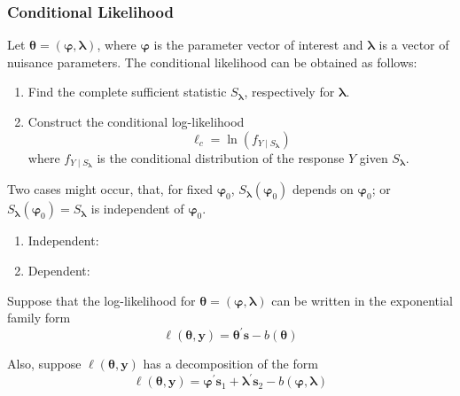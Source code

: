 \subsubsection{Conditional Likelihood}

Let $\boldsymbol{\theta}=(\boldsymbol{\varphi},\boldsymbol{\lambda})$, where $\boldsymbol{\varphi}$ is the parameter vector of interest and $\boldsymbol{\lambda}$ is a vector of nuisance parameters. The conditional likelihood can be obtained as follows:
\begin{enumerate}
    \item Find the complete sufficient statistic $S_{\boldsymbol{\lambda}}$, respectively for $\boldsymbol{\lambda}$.
    \item  Construct the conditional log-likelihood
          \begin{equation}
              \ell_{c}=\ln\left(f_{Y\mid S_{\boldsymbol{\lambda}}}\right)
          \end{equation}
          where $f_{Y\mid S_{\boldsymbol{\lambda}}}$ is the conditional distribution of the response $Y$ given $S_{\boldsymbol{\lambda}}$.
\end{enumerate}

\begin{remark}
    Two cases might occur, that, for fixed $\boldsymbol{\varphi}_{0}$, $S_{\boldsymbol{\lambda}}\left(\boldsymbol{\varphi}_{0}\right)$ depends on $\boldsymbol{\varphi}_{0}$; or $S_{\boldsymbol{\lambda}}\left(\boldsymbol{\varphi}_{0}\right)=S_{\boldsymbol{\lambda}}$ is independent of $\boldsymbol{\varphi}_{0}$.
    \begin{enumerate}
        \item Independent:
        \item Dependent:
    \end{enumerate}
\end{remark}

Suppose that the log-likelihood for $\boldsymbol{\theta}=\left(\boldsymbol{\varphi},\boldsymbol{\lambda}\right)$ can be written in the exponential family form
\begin{equation}
    \ell\left(\boldsymbol{\theta},\mathbf{y}\right)=\boldsymbol{\theta}^{\prime}\mathbf{s}-b\left(\boldsymbol{\theta}\right)
\end{equation}

Also, suppose $\ell\left(\boldsymbol{\theta},\mathbf{y}\right)$ has a decomposition of the form
\begin{equation}
    \ell\left(\boldsymbol{\theta},\mathbf{y}\right)=\boldsymbol{\varphi}^{\prime}\mathbf{s}_{1}+\boldsymbol{\lambda}^{\prime}\mathbf{s}_{2}-b(\boldsymbol{\varphi},\boldsymbol{\lambda})
\end{equation}

